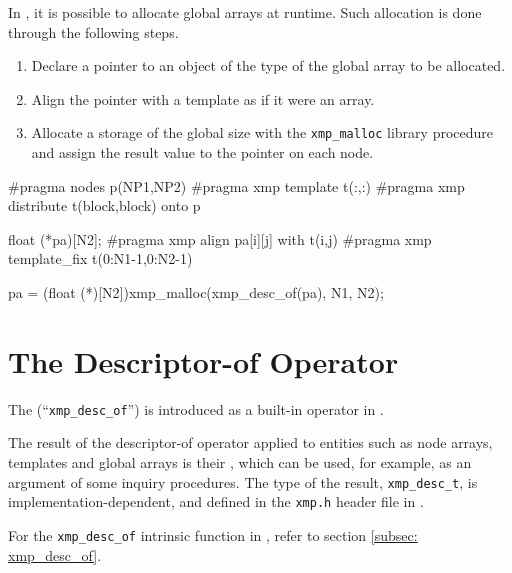 In {\XMPC}, it is possible to allocate global arrays at runtime.
%
Such allocation is done through the following steps.
%
\begin{enumerate}
 \item Declare a pointer to an object of the type of the global array to
       be allocated.
 \item Align the pointer with a template as if it were an array.
 \item Allocate a storage of the global size with the {\tt xmp\_malloc}
       library procedure and assign the result value to the
       pointer on each node.
\end{enumerate}

\begin{XCexample}
#pragma nodes p(NP1,NP2)
#pragma xmp template t(:,:)
#pragma xmp distribute t(block,block) onto p

float (*pa)[N2];
#pragma xmp align pa[i][j] with t(i,j)
#pragma xmp template_fix t(0:N1-1,0:N2-1)

pa = (float (*)[N2])xmp_malloc(xmp_desc_of(pa), N1, N2);
\end{XCexample}

\section{The Descriptor-of Operator}
\label{sec:Descriptor of Global Data in C}


The  (``{\tt xmp\_desc\_of}'') is
introduced as a built-in operator in {\XMPC}.

The result of the descriptor-of operator applied to {\XMP} entities such
as node arrays, templates and global arrays is their {\it
{}}, which can be used, for example, as an argument of
some inquiry procedures. The type of the result, {\tt xmp\_desc\_t}, is
implementation-dependent, and defined in the {\tt xmp.h} header file in
{\XMPC}.

For the {\tt xmp\_desc\_of} intrinsic function in {\XMPF}, refer to
section \ref{subsec: xmp_desc_of}.

